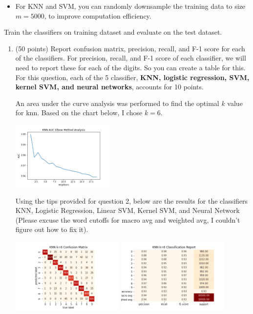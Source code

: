 \documentclass[twoside,10pt]{article}
\begin{document}
\begin{enumerate}
\begin{itemize}
\item For KNN and SVM, you can randomly downsample the training data to size $m=5000$, to improve computation efficiency. 
\end{itemize}

Train the classifiers on training dataset and evaluate on the test dataset.

\begin{enumerate}

	\item (50 points) Report confusion matrix, precision, recall, and F-1 score for each of the classifiers. For precision, recall, and F-1 score of each classifier, we will  need to report these for each of the digits. So you can create a table for this. For this question, each of the 5 classifier, {\bf KNN, logistic regression, SVM, kernel SVM, and  neural networks}, accounts for 10 points.
	
	\vspace{5 mm}
	
	An area under the curve analysis was performed to find the optimal $k$ value for knn. Based on the chart below, I chose $k = 6$.
	
	\begin{center}
	\includegraphics[width = 0.4\textwidth]{knn_auc}
	\end{center}
	
	\vspace{80 mm}
	
	Using the tips provided for question 2, below are the results for the classifiers KNN, Logistic Regression, Linear SVM, Kernel SVM, and Neural Network (Please excuse the word cutoffs for macro avg and weighted avg, I couldn't figure out how to fix it).
	
	\begin{center}
	\includegraphics[width = 0.44\textwidth]{knn}
	\includegraphics[width = 0.44\textwidth]{knn_class}
	\end{center}


\end{enumerate}
\end{enumerate}
\end{document}
